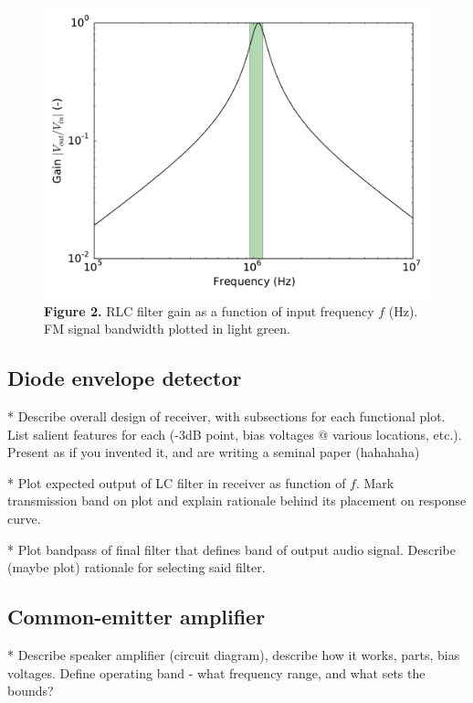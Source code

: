 \documentclass[11pt]{article}
\begin{document}
\begin{figure}[h]
    \centering
    \includegraphics[scale=0.5]{scripts/rlc_filter_gain.pdf} \\
    \textbf{Figure 2.} RLC filter gain as a function of input frequency $f$
    (Hz).  FM signal bandwidth plotted in light green.
\end{figure}



\subsection{Diode envelope detector}

* Describe overall design of receiver, with subsections for each functional plot.  List salient features for each (-3dB point, bias voltages @ various locations, etc.). Present as if you invented it, and are writing a seminal paper (hahahaha)

* Plot expected output of LC filter in receiver as function of $f$.  Mark transmission band on plot and explain rationale behind its placement on response curve.

* Plot bandpass of final filter that defines band of output audio signal.  Describe (maybe plot) rationale for selecting said filter.

\subsection{Common-emitter amplifier}

* Describe speaker amplifier (circuit diagram), describe how it works, parts, bias voltages.  Define operating band - what frequency range, and what sets the bounds?
\end{document}
